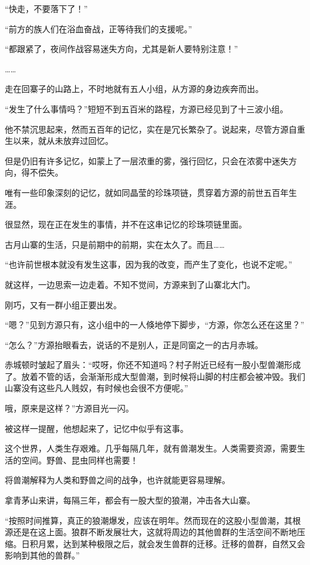 
\begin{this_body}

“快走，不要落下了！”

“前方的族人们在浴血奋战，正等待我们的支援呢。”

“都跟紧了，夜间作战容易迷失方向，尤其是新人要特别注意！”

……

走在回寨子的山路上，不时地就有五人小组，从方源的身边疾奔而出。

“发生了什么事情吗？”短短不到五百米的路程，方源已经见到了十三波小组。

他不禁沉思起来，然而五百年的记忆，实在是冗长繁杂了。说起来，尽管方源自重生以来，就从未放弃过回忆。

但是仍旧有许多记忆，如蒙上了一层浓重的雾，强行回忆，只会在浓雾中迷失方向，得不偿失。

唯有一些印象深刻的记忆，就如同晶莹的珍珠项链，贯穿着方源的前世五百年生涯。

很显然，现在正在发生的事情，并不在这串记忆的珍珠项链里面。

古月山寨的生活，只是前期中的前期，实在太久了。而且……

“也许前世根本就没有发生这事，因为我的改变，而产生了变化，也说不定呢。”

就这样，一边思索一边走着。不知不觉间，方源来到了山寨北大门。

刚巧，又有一群小组正要出发。

“嗯？”见到方源只有，这小组中的一人倏地停下脚步，“方源，你怎么还在这里？”

“怎么？”方源抬眼看去，说话的不是别人，正是同窗之一的古月赤城。

赤城顿时皱起了眉头：“哎呀，你还不知道吗？村子附近已经有一股小型兽潮形成了。放着不管的话，会渐渐形成大型兽潮，到时候将山脚的村庄都会被冲毁。我们山寨没有这些凡人贱奴，有时候也会很不方便呢。”

哦，原来是这样？”方源目光一闪。

被这样一提醒，他想起来了，记忆中似乎有这事。

这个世界，人类生存艰难。几乎每隔几年，就有兽潮发生。人类需要资源，需要生活的空间。野兽、昆虫同样也需要！

将兽潮解释为人类和野兽之间的战争，也许就能更容易理解。

拿青茅山来讲，每隔三年，都会有一股大型的狼潮，冲击各大山寨。

“按照时间推算，真正的狼潮爆发，应该在明年。然而现在的这股小型兽潮，其根源还是在这上面。狼群不断发展壮大，这就将周边的其他兽群的生活空间不断地压缩。日积月累，达到某种极限之后，就会发生兽群的迁移。迁移的兽群，自然又会影响到其他的兽群。”


\end{this_body}
